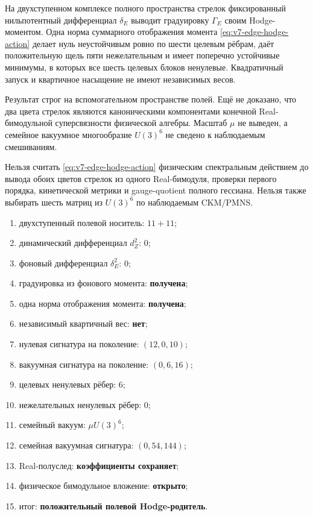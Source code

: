 \begin{theorem}
На двухступенном комплексе полного пространства стрелок фиксированный
нильпотентный дифференциал $\delta_E$ выводит градуировку $\Gamma_E$ своим
Hodge-моментом. Одна норма суммарного отображения момента
\eqref{eq:v7-edge-hodge-action} делает нуль неустойчивым ровно по шести
целевым рёбрам, даёт положительную щель пяти нежелательным и имеет
поперечно устойчивые минимумы, в которых все шесть целевых блоков ненулевые.
Квадратичный запуск и квартичное насыщение не имеют независимых весов.
\end{theorem}

Результат строг на вспомогательном пространстве полей. Ещё не доказано,
что два цвета стрелок являются каноническими компонентами конечной
Real-бимодульной суперсвязности физической алгебры. Масштаб $\mu$ не выведен,
а семейное вакуумное многообразие $U(3)^6$ не сведено к наблюдаемым
смешиваниям.

\begin{nogocriterion}
Нельзя считать \eqref{eq:v7-edge-hodge-action} физическим спектральным
действием до вывода обоих цветов стрелок из одного Real-бимодуля, проверки
первого порядка, кинетической метрики и gauge-quotient полного гессиана.
Нельзя также выбирать шесть матриц из $U(3)^6$ по наблюдаемым CKM/PMNS.
\end{nogocriterion}

\begin{protocol}
\begin{enumerate}
 \item двухступенный полевой носитель: \textbf{$11+11$};
 \item динамический дифференциал $d_Z^2$: \textbf{$0$};
 \item фоновый дифференциал $\delta_E^2$: \textbf{$0$};
 \item градуировка из фонового момента: \textbf{получена};
 \item одна норма отображения момента: \textbf{получена};
 \item независимый квартичный вес: \textbf{нет};
 \item нулевая сигнатура на поколение: \textbf{$(12,0,10)$};
 \item вакуумная сигнатура на поколение: \textbf{$(0,6,16)$};
 \item целевых ненулевых рёбер: \textbf{$6$};
 \item нежелательных ненулевых рёбер: \textbf{$0$};
 \item семейный вакуум: \textbf{$\mu U(3)^6$};
 \item семейная вакуумная сигнатура: \textbf{$(0,54,144)$};
 \item Real-полуслед: \textbf{коэффициенты сохраняет};
 \item физическое бимодульное вложение: \textbf{открыто};
 \item итог: \textbf{положительный полевой Hodge-родитель}.
\end{enumerate}
\end{protocol}

